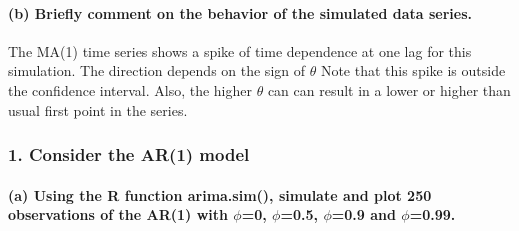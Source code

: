 \documentclass[]{article}
\let\oldparagraph\paragraph
\renewcommand{\paragraph}[1]{\oldparagraph{#1}\mbox{}}
\begin{document}
\paragraph{(b) Briefly comment on the behavior of the simulated data
series.}\label{b-briefly-comment-on-the-behavior-of-the-simulated-data-series.}

The MA(1) time series shows a spike of time dependence at one lag for
this simulation. The direction depends on the sign of \(\theta\) Note
that this spike is outside the confidence interval. Also, the higher
\(\theta\) can can result in a lower or higher than usual first point in
the series.

\subsubsection{1. Consider the AR(1)
model}\label{consider-the-ar1-model}

\paragraph{\texorpdfstring{(a) Using the R function arima.sim(),
simulate and plot 250 observations of the AR(1) with \(\phi\)=0,
\(\phi\)=0.5, \(\phi\)=0.9 and
\(\phi\)=0.99.}{(a) Using the R function arima.sim(), simulate and plot 250 observations of the AR(1) with \textbackslash{}phi=0, \textbackslash{}phi=0.5, \textbackslash{}phi=0.9 and \textbackslash{}phi=0.99.}}\label{a-using-the-r-function-arima.sim-simulate-and-plot-250-observations-of-the-ar1-with-phi0-phi0.5-phi0.9-and-phi0.99.}
\end{document}
